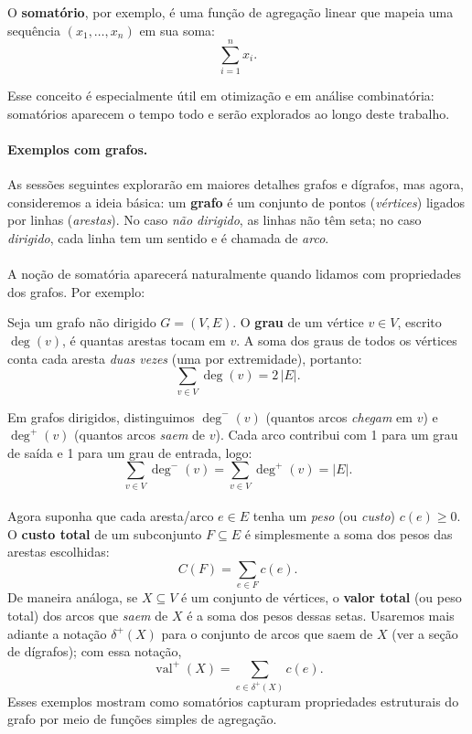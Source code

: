 \documentclass[12pt,a4paper]{article}
\begin{document}
O \textbf{somatório}, por exemplo, é uma função de agregação linear que mapeia uma sequência \((x_1,\dots,x_n)\) em sua soma:
\[\sum_{i=1}^{n} x_i.\]

Esse conceito é especialmente útil em otimização e em análise combinatória: somatórios aparecem o tempo todo e serão explorados ao longo deste trabalho.

\paragraph{Exemplos com grafos.}
As sessões seguintes explorarão em maiores detalhes grafos e dígrafos, mas agora, consideremos a ideia básica: um \textbf{grafo} é um conjunto de pontos (\emph{vértices}) ligados por linhas (\emph{arestas}). No caso \emph{não dirigido}, as linhas não têm seta; no caso \emph{dirigido}, cada linha tem um sentido e é chamada de \emph{arco}.

\paragraph{}
A noção de somatória aparecerá naturalmente quando lidamos com propriedades dos grafos. Por exemplo:

Seja um grafo não dirigido \(G=(V,E)\). O \textbf{grau} de um vértice \(v\in V\), escrito \(\deg(v)\), é quantas arestas tocam em \(v\). A soma dos graus de todos os vértices conta cada aresta \emph{duas vezes} (uma por extremidade), portanto:
\[\sum_{v\in V} \deg(v) = 2\,|E|.\]

Em grafos dirigidos, distinguimos \(\deg^{-}(v)\) (quantos arcos \emph{chegam} em \(v\)) e \(\deg^{+}(v)\) (quantos arcos \emph{saem} de \(v\)). Cada arco contribui com 1 para um grau de saída e 1 para um grau de entrada, logo:
\[\sum_{v\in V} \deg^{-}(v) = \sum_{v\in V} \deg^{+}(v) = |E|.\]

\paragraph{}
Agora suponha que cada aresta/arco \(e\in E\) tenha um \emph{peso} (ou \emph{custo}) \(c(e)\ge 0\). O \textbf{custo total} de um subconjunto \(F\subseteq E\) é simplesmente a soma dos pesos das arestas escolhidas:
\[C(F) = \sum_{e\in F} c(e).\]
De maneira análoga, se \(X\subseteq V\) é um conjunto de vértices, o \textbf{valor total} (ou peso total) dos arcos que \emph{saem} de \(X\) é a soma dos pesos dessas setas. Usaremos mais adiante a notação \(\delta^{+}(X)\) para o conjunto de arcos que saem de \(X\) (ver a seção de dígrafos); com essa notação,
\[\operatorname{val}^+(X) = \sum_{e\in \delta^{+}(X)} c(e).\]
Esses exemplos mostram como somatórios capturam propriedades estruturais do grafo por meio de funções simples de agregação.
\end{document}
